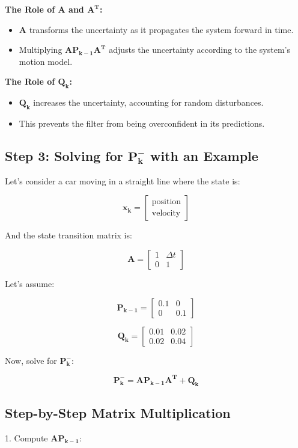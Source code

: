 \documentclass{article}
\begin{document}
\textbf{The Role of \(\mathbf{A}\) and \(\mathbf{A^T}\):}
\begin{itemize}
    \item \(\mathbf{A}\) transforms the uncertainty as it propagates the system forward in time.
    \item Multiplying \(\mathbf{A P_{k-1} A^T}\) adjusts the uncertainty according to the system's motion model.
\end{itemize}

\textbf{The Role of \(\mathbf{Q_k}\):}
\begin{itemize}
    \item \(\mathbf{Q_k}\) increases the uncertainty, accounting for random disturbances.
    \item This prevents the filter from being overconfident in its predictions.
\end{itemize}

\subsection*{Step 3: Solving for \(\mathbf{P_k^-}\) with an Example}
Let's consider a car moving in a straight line where the state is:

\[
\mathbf{x_k} =
\begin{bmatrix}
\text{position} \\
\text{velocity}
\end{bmatrix}
\]

And the state transition matrix is:

\[
\mathbf{A} =
\begin{bmatrix}
1 & \Delta t \\
0 & 1
\end{bmatrix}
\]

Let's assume:

\[
\mathbf{P_{k-1}} =
\begin{bmatrix}
0.1 & 0 \\
0 & 0.1
\end{bmatrix}
\]

\[
\mathbf{Q_k} =
\begin{bmatrix}
0.01 & 0.02 \\
0.02 & 0.04
\end{bmatrix}
\]

Now, solve for \(\mathbf{P_k^-}\):

\[
\mathbf{P_k^-} = \mathbf{A P_{k-1} A^T} + \mathbf{Q_k}
\]

\subsection*{Step-by-Step Matrix Multiplication}
1. Compute \(\mathbf{A P_{k-1}}\):
\end{document}
